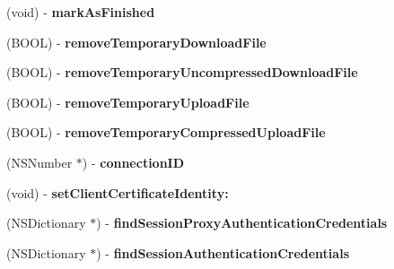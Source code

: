 \begin{DoxyCompactItemize}
\item 
\hypertarget{interface_a_s_i_h_t_t_p_request_a0b812d27bc2a7ad7715e6d890923426e}{
(void) -\/ {\bfseries mark\-As\-Finished}}
\label{interface_a_s_i_h_t_t_p_request_a0b812d27bc2a7ad7715e6d890923426e}

\item 
\hypertarget{interface_a_s_i_h_t_t_p_request_a0e68fd4f22a1b5cdcfb3e63a3cdacde9}{
(\-B\-O\-O\-L) -\/ {\bfseries remove\-Temporary\-Download\-File}}
\label{interface_a_s_i_h_t_t_p_request_a0e68fd4f22a1b5cdcfb3e63a3cdacde9}

\item 
\hypertarget{interface_a_s_i_h_t_t_p_request_af8ef43877926d01b8a51abb62dd2e208}{
(\-B\-O\-O\-L) -\/ {\bfseries remove\-Temporary\-Uncompressed\-Download\-File}}
\label{interface_a_s_i_h_t_t_p_request_af8ef43877926d01b8a51abb62dd2e208}

\item 
\hypertarget{interface_a_s_i_h_t_t_p_request_aaf8e3adbbf00110b67232158921553c0}{
(\-B\-O\-O\-L) -\/ {\bfseries remove\-Temporary\-Upload\-File}}
\label{interface_a_s_i_h_t_t_p_request_aaf8e3adbbf00110b67232158921553c0}

\item 
\hypertarget{interface_a_s_i_h_t_t_p_request_a4f8b19d66be57ffad0d6128182c98414}{
(\-B\-O\-O\-L) -\/ {\bfseries remove\-Temporary\-Compressed\-Upload\-File}}
\label{interface_a_s_i_h_t_t_p_request_a4f8b19d66be57ffad0d6128182c98414}

\item 
\hypertarget{interface_a_s_i_h_t_t_p_request_a3e06c0a51784d32cc8198f616e63c530}{
(\-N\-S\-Number $\ast$) -\/ {\bfseries connection\-I\-D}}
\label{interface_a_s_i_h_t_t_p_request_a3e06c0a51784d32cc8198f616e63c530}

\item 
\hypertarget{interface_a_s_i_h_t_t_p_request_a4f24e48396e06b8a81de111e19c1314a}{
(void) -\/ {\bfseries set\-Client\-Certificate\-Identity\-:}}
\label{interface_a_s_i_h_t_t_p_request_a4f24e48396e06b8a81de111e19c1314a}

\item 
\hypertarget{interface_a_s_i_h_t_t_p_request_a480d62ba0d9ba8d1a64b25b45fb2d965}{
(\-N\-S\-Dictionary $\ast$) -\/ {\bfseries find\-Session\-Proxy\-Authentication\-Credentials}}
\label{interface_a_s_i_h_t_t_p_request_a480d62ba0d9ba8d1a64b25b45fb2d965}

\item 
\hypertarget{interface_a_s_i_h_t_t_p_request_a0f38ffc0ae199e83262895f640c9c263}{
(\-N\-S\-Dictionary $\ast$) -\/ {\bfseries find\-Session\-Authentication\-Credentials}}
\label{interface_a_s_i_h_t_t_p_request_a0f38ffc0ae199e83262895f640c9c263}


\end{DoxyCompactItemize}
